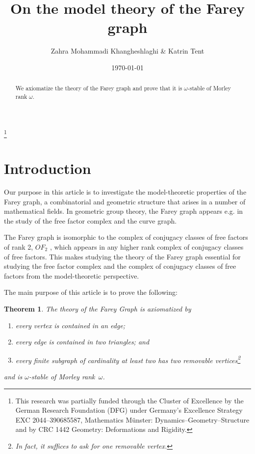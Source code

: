 \documentclass{amsart}
\newtheorem{theorem}[defi]{Theorem}
\begin{document}
\author{Zahra Mohammadi  Khangheshlaghi \& Katrin Tent}
\thanks{This research was partially funded through the Cluster of Excellence by the
German Research Foundation (DFG) under Germany’s Excellence Strategy EXC
2044–390685587, Mathematics M\"unster: Dynamics–Geometry–Structure and by
CRC 1442 Geometry: Deformations and Rigidity.
}
\date{\today}
\title{On the model theory of the Farey graph}
\begin{abstract}
 We axiomatize the theory of the Farey graph and prove that it is $\omega$-stable of Morley rank $\omega$.
\end{abstract}

\maketitle
\section{Introduction}



Our purpose in this article is to investigate the model-theoretic properties of the Farey graph, 
a combinatorial and geometric structure that arises in a number of mathematical fields. 
In geometric group theory, the Farey graph appears e.g. in the study of the free factor complex and the curve graph.

The Farey graph is isomorphic to the complex of conjugacy classes of free factors of rank 2, $OF_2$ \cite{Free_factor_complex_rigidity}, which appears 
in any higher rank complex of conjugacy classes of free factors. This makes studying the theory of the Farey graph essential 
for studying the free factor complex and the complex of conjugacy classes of free factors from the model-theoretic perspective.



The main purpose of this article is to prove the following:

\begin{theorem} \label{main_th}
    The theory of the Farey Graph is axiomatized by
\begin{enumerate}
\item every vertex is contained in an edge;
\item every edge is contained in two triangles; and

\item every finite subgraph of cardinality at least two has two removable vertices\footnote{In fact, it suffices to ask for one removable vertex.}
\end{enumerate}
and   is $\omega$-stable of Morley rank~$\omega$.
\end{theorem}
\end{document}

